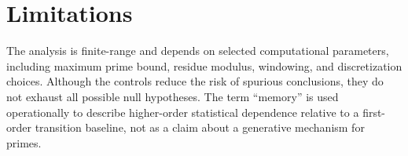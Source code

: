 \section{Limitations}

The analysis is finite-range and depends on selected computational parameters, including maximum prime bound, residue modulus, windowing, and discretization choices. Although the controls reduce the risk of spurious conclusions, they do not exhaust all possible null hypotheses. The term ``memory'' is used operationally to describe higher-order statistical dependence relative to a first-order transition baseline, not as a claim about a generative mechanism for primes.

